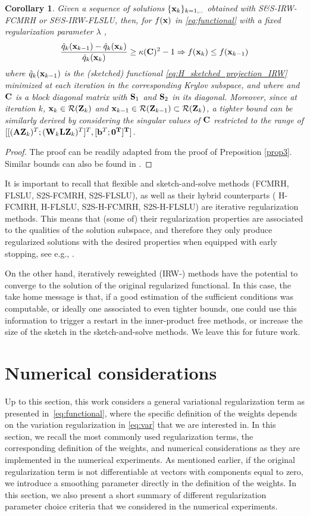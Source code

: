 \documentclass[11pt]{article}
\numberwithin{equation}{section}
\newtheorem{corollary}{Corollary}
\newcommand{\bfA}{{\bf A}}
\newcommand{\bfC}{{\bf C}}
\newcommand{\bfL}{{\bf L}}
\newcommand{\bfS}{{\bf S}}
\newcommand{\bfW}{{\bf W}}
\newcommand{\bfZ}{{\bf Z}}
\newcommand{\bfb}{{\bf b}}
\newcommand{\bfx}{{\bf x}}
\begin{document}
\begin{corollary} Given a sequence of solutions $\{\bfx_k\}_{k=1,..	}$ obtained with S\&S-IRW-FCMRH or S\&S-IRW-FLSLU, then, for $f(\bfx)$ in \eqref{eq:functional} with a fixed regularization parameter $\lambda$ ,
\[
\frac{\hat q_k(\bfx_{k-1})-\hat q_k(\bfx_{k})}{\hat q_k(\bfx_{k})} \geq \kappa(\bfC)^2-1 \Rightarrow f(\bfx_k) \leq f(\bfx_{k-1}) 
\]
where $\hat q_k(\bfx_{k-1})$ is the (sketched) functional \eqref{eq:H_sketched_projection_IRW} minimized at each iteration in the corresponding Krylov subspace, and where and $\bfC$ is a block diagonal matrix with $\bfS_{1}$ and $\bfS_{2}$ in its diagonal. Moreover, since at iteration $k$, $\bfx_{k} \in \mathcal{R}(\bfZ_k)$ and $\bfx_{k-1} \in \mathcal{R}(\bfZ_{k-1})\subset \mathcal{R}(\bfZ_k)$, a tighter bound can be similarly derived by considering the singular values of $\bfC$ restricted to the range of $[[(\bfA \bfZ_k)^T;(\bfW_k \bfL \bfZ_k)^T]^T,[\bfb^T;\bf0^T]^T]$. 
\end{corollary}
\begin{proof}
The proof can be readily adapted from the proof of Preposition \ref{prop3}. Similar bounds can also be found in \cite{Sabate2025rand}.
\end{proof}
It is important to recall that flexible and sketch-and-solve methods (FCMRH, FLSLU, S2S-FCMRH, S2S-FLSLU), as well as their hybrid counterparts  ( H-FCMRH, H-FLSLU, S2S-H-FCMRH, S2S-H-FLSLU) are iterative regularization methods. This means that (some of) their regularization properties are associated to the qualities of the solution subspace, and therefore they only produce regularized solutions with the desired properties when equipped with early stopping, see e.g., \cite{Hansen2010}. 

On the other hand, iteratively reweighted (IRW-) methods have the potential to converge to the solution of the original regularized functional. In this case, the take home message is that, if a good estimation of the sufficient conditions was computable, or ideally one associated to even tighter bounds, one could use this information to trigger a restart in the inner-product free methods, or increase the size of the sketch in the sketch-and-solve methods. We leave this for future work.


\section{Numerical considerations}\label{sec55}
Up to this section, this work considers a general variational regularization term as presented in~\eqref{eq:functional}, where the specific definition of the weights depends on the variation regularization in \eqref{eq:var} that we are interested in. In this section, we recall the most commonly used regularization terms, the corresponding definition of the weights, and numerical considerations as they are implemented in the numerical experiments. As mentioned earlier, if the original regularization term is not differentiable at vectors with components equal to zero, we introduce a smoothing parameter directly in the definition of the weights. In this section, we also present a short summary of different regularization parameter choice criteria that we considered in the numerical experiments.
\end{document}
